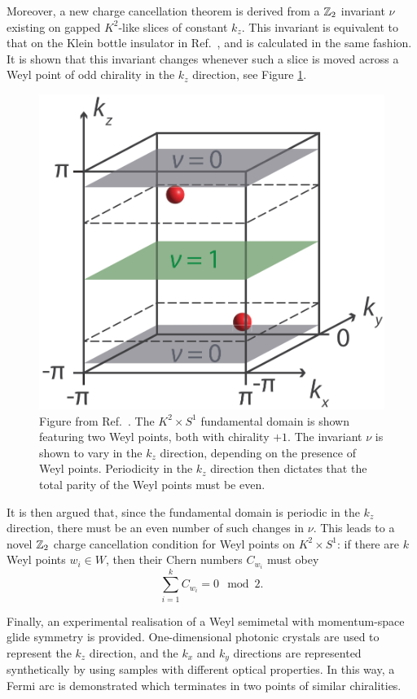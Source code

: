 Moreover, a new charge cancellation theorem is derived from a $\mathbb{Z}_2$ invariant $\nu$ existing on gapped $K^2$-like slices of constant $k_z$. This invariant is equivalent to that on the Klein bottle insulator in Ref.~\cite{CYZ_Klein-gauge}, and is calculated in the same fashion. It is shown that this invariant changes whenever such a slice is moved across a Weyl point of odd chirality in the $k_z$ direction, see Figure \ref{fig:Z2-cancellation}.
\begin{figure}[htb!]
	\centering
	\includegraphics[width=.5\linewidth]{Images/Z2-cancellation}
	\caption{Figure from Ref.~\cite{Fonseca-Vaidya_nonorientable}. The $K^2\times S^1$ fundamental domain is shown featuring two Weyl points, both with chirality $+1$. The invariant $\nu$ is shown to vary in the $k_z$ direction, depending on the presence of Weyl points. Periodicity in the $k_z$ direction then dictates that the total parity of the Weyl points must be even.}
	\label{fig:Z2-cancellation}
\end{figure}
It is then argued that, since the fundamental domain is periodic in the $k_z$ direction, there must be an even number of such changes in $\nu$. This leads to a novel $\mathbb{Z}_2$ charge cancellation condition for Weyl points on $K^2\times S^1$: if there are $k$ Weyl points $w_i\in W$, then their Chern numbers $C_{w_i}$ must obey
\begin{equation}\label{eq:Z2-cancellation}
	\sum_{i=1}^{k}C_{w_i} = 0 \mod 2.
\end{equation}

Finally, an experimental realisation of a Weyl semimetal with momentum-space glide symmetry is provided. One-dimensional photonic crystals are used to represent the $k_z$ direction, and the $k_x$ and $k_y$ directions are represented synthetically by using samples with different optical properties. In this way, a Fermi arc is demonstrated which terminates in two points of similar chiralities.

